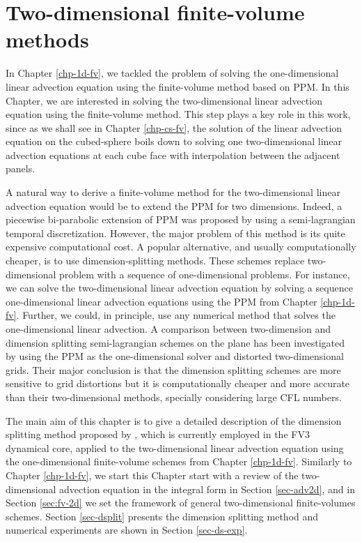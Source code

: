 \chapter{Two-dimensional finite-volume methods}
\label{chp-2d-fv}
In Chapter \ref{chp-1d-fv}, we tackled the problem of solving the one-dimensional linear
advection equation using the finite-volume method based on PPM.
In this Chapter, we are interested in solving the two-dimensional linear
advection equation using the finite-volume method. This step plays a key role in this work,
since as we shall see in Chapter  \ref{chp-cs-fv}, the solution of the linear
advection equation on the cubed-sphere boils down to solving one two-dimensional linear
advection equations at each cube face with interpolation between the adjacent panels.

A natural way to derive a finite-volume method for the two-dimensional linear
advection equation would be to extend the PPM for two dimensions. Indeed, a piecewise bi-parabolic extension of PPM
was proposed by \citet{rancic:1992} using a semi-lagrangian temporal discretization. 
However, the major problem of this method is its quite expensive computational cost.
A popular alternative, and usually computationally cheaper, is to use dimension-splitting methods.
These schemes replace two-dimensional problem with a sequence of one-dimensional problems.
For instance, we can solve the two-dimensional linear advection equation by solving a sequence
one-dimensional linear advection equations using the PPM  from Chapter \ref{chp-1d-fv}.
Further, we could, in principle, use any numerical method that solves the one-dimensional linear advection. 
A comparison between two-dimension and dimension splitting semi-lagrangian schemes on the plane has been investigated by \citet{chen:2017}
using the PPM as the one-dimensional solver and distorted two-dimensional grids.
Their major conclusion is that the dimension splitting schemes are more sensitive to grid distortions
but it is computationally cheaper and more accurate than their two-dimensional methods, 
specially considering large CFL numbers.

The main aim of this chapter is to give a detailed description of the dimension
splitting method proposed by \citet{lin:1996}, which is currently employed in the FV3 dynamical core,
applied to the two-dimensional linear advection equation using the one-dimensional
finite-volume schemes from Chapter \ref{chp-1d-fv}.
Similarly to Chapter \ref{chp-1d-fv}, we start this Chapter 
start with a review of the two-dimensional advection equation in
the integral form in Section \ref{sec-adv2d}, 
and in Section \ref{sec:fv-2d} we set the framework of
general two-dimensional finite-volumes schemes.
Section \ref{sec-dsplit} presents the dimension splitting method and 
numerical experiments are shown in Section \ref{sec-ds-exp}.

